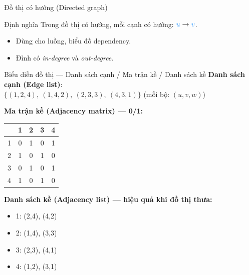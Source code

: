 \documentclass{beamer}
\newcommand{\hlblue}[1]{\textcolor{myblue}{#1}}
\newcommand{\hlgreen}[1]{\textcolor{mygreen}{#1}}
\newcommand{\hlred}[1]{\textcolor{myred}{#1}}
\newcommand{\hlpurple}[1]{\textcolor{mypurple}{#1}}
\newcommand{\hlorange}[1]{\textcolor{myorange}{#1}}
\newcommand{\hlcyan}[1]{\textcolor{mycyan}{#1}}
\begin{document}
\begin{frame}{\hlorange{Đồ thị có hướng (Directed graph)}}
\begin{block}{\hlgreen{Định nghĩa}}
Trong đồ thị \hlred{có hướng}, mỗi cạnh có hướng: \(\hlblue{u} \rightarrow \hlblue{v}\).
\end{block}

\begin{itemize}
\item Dùng cho luồng, biểu đồ dependency.
\item Đỉnh có {\em \hlcyan{in-degree}} và {\em \hlcyan{out-degree}}.
\end{itemize}

\begin{center}
\end{center}
\end{frame}

\begin{frame}[t]{\hlorange{Biểu diễn đồ thị} — \hlred{Danh sách cạnh} / \hlgreen{Ma trận kề} / \hlpurple{Danh sách kề}}
\scriptsize
\textbf{\hlorange{Danh sách cạnh (Edge list)}}: \\[2pt]
$\{(1,2,4),\ (1,4,2),\ (2,3,3),\ (4,3,1)\}$ \quad (\hlcyan{mỗi bộ: $(u,v,w)$})

\medskip
\textbf{\hlgreen{Ma trận kề (Adjacency matrix)} — 0/1:}
\begin{center}
\begin{tabular}{c|cccc}
\rowcolor{tablehead}\color{tableheadtxt} & \color{tableheadtxt}1 & \color{tableheadtxt}2 & \color{tableheadtxt}3 & \color{tableheadtxt}4\\\hline
1 & 0 & 1 & 0 & 1\\
2 & 1 & 0 & 1 & 0\\
3 & 0 & 1 & 0 & 1\\
4 & 1 & 0 & 1 & 0
\end{tabular}
\end{center}

\medskip
\textbf{\hlpurple{Danh sách kề (Adjacency list)} — hiệu quả khi đồ thị thưa:}
\begin{itemize}\scriptsize
\item \hlblue{1}: (2,4), (4,2)
\item \hlblue{2}: (1,4), (3,3)
\item \hlblue{3}: (2,3), (4,1)
\item \hlblue{4}: (1,2), (3,1)
\end{itemize}
\end{frame}
\end{document}
